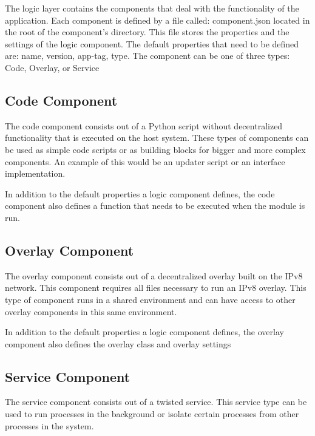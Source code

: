 
The logic layer contains the components that deal with the functionality of the application. Each component is defined by a file called: component.json located in the root of the component's directory. This file stores the properties and the settings of the logic component. The default properties that need to be defined are: name, version, app-tag, type. The component can be one of three types: Code, Overlay, or Service

\subsection{Code Component}

The code component consists out of a Python script without decentralized functionality that is executed on the host system. These types of components can be used as simple code scripts or as building blocks for bigger and more complex components. An example of this would be an updater script or an interface implementation.

In addition to the default properties a logic component defines, the code component also defines a function that needs to be executed when the module is run.

\subsection{Overlay Component}

The overlay component consists out of a decentralized overlay built on the IPv8 network. This component requires all files necessary to run an IPv8 overlay. This type of component runs in a shared environment and can have access to other overlay components in this same environment.

In addition to the default properties a logic component defines, the overlay component also defines the overlay class and overlay settings


\subsection{Service Component}

The service component consists out of a twisted service. This service type can be used to run processes in the background or isolate certain processes from other processes in the system.

